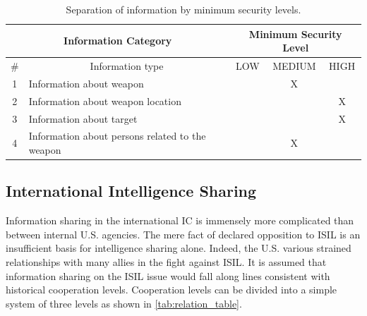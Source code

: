 \documentclass{report}
\begin{document}
\begin{table}
\centering
\begin{tabular}{|c|l|c|c|c|}
\hline
\multicolumn{2}{|c|}{Information Category}           & \multicolumn{3}{c|}{Minimum Security Level}                                                 \\ \hline
\# & \multicolumn{1}{c|}{Information type}           & \cellcolor[HTML]{34FF34}LOW & \cellcolor[HTML]{FCFF2F}MEDIUM & \cellcolor[HTML]{FE0000}HIGH \\ \hline
1  & Information about weapon                        & \cellcolor[HTML]{34FF34}    & \cellcolor[HTML]{FCFF2F}X      & \cellcolor[HTML]{FE0000}     \\ \hline
2  & Information about weapon location               & \cellcolor[HTML]{34FF34}    & \cellcolor[HTML]{FCFF2F}       & \cellcolor[HTML]{FE0000}X    \\ \hline
3  & Information about target                        & \cellcolor[HTML]{34FF34}    & \cellcolor[HTML]{FCFF2F}       & \cellcolor[HTML]{FE0000}X    \\ \hline
4  & Information about persons related to the weapon & \cellcolor[HTML]{34FF34}    & \cellcolor[HTML]{FCFF2F}X      & \cellcolor[HTML]{FE0000}     \\ \hline
\end{tabular}
\caption{Separation of information by minimum security levels.}
\label{tab:separate_sec_level}
\end{table}

\subsection{International Intelligence Sharing}

Information sharing in the international IC is immensely more complicated than between internal U.S. agencies. The mere fact of declared opposition to ISIL is an insufficient basis for intelligence sharing alone.  Indeed, the U.S. various strained relationships with many allies in the fight against ISIL. It is assumed that information sharing on the ISIL issue would fall along lines consistent with historical cooperation levels. Cooperation levels can be divided into a simple system of three levels as shown in \autoref{tab:relation_table}.
\end{document}
